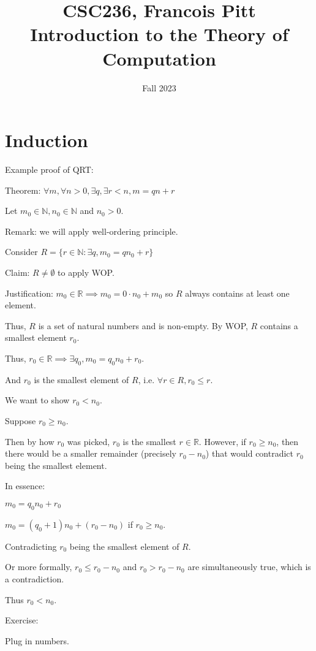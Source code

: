 \documentclass{article}
\title{CSC236, Francois Pitt \\ Introduction to the Theory of Computation}
\author{}
\date{Fall 2023}
\newcommand{\N}{\mathbb{N}}
\newcommand{\R}{\mathbb{R}}
\begin{document}
    
\maketitle

\tableofcontents

\pagebreak

\section{Induction}

Example proof of QRT:

Theorem: $\forall m, \forall n > 0, \exists q, \exists r < n, m = qn + r $

Let $m_0 \in \N, n_0 \in \N$ and $n_0 > 0$.

Remark: we will apply well-ordering principle. 

Consider $R=\{r \in \N : \exists q, m_0 = qn_0 + r\}$

Claim: $R \neq \emptyset$ to apply WOP\@.

Justification: $m_0 \in \R \implies m_0 = 0\cdot n_0 + m_0$ so $R$ always contains at least one element.

Thus, $R$ is a set of natural numbers and is non-empty. By WOP, $R$ contains a smallest element $r_0$.

Thus, $r_0 \in \R \implies \exists q_0, m_0 = q_0n_0 + r_0$.

And $r_0$ is the smallest element of $R$, i.e. $\forall r \in R, r_0 \leq r$.

We want to show $r_0 < n_0$.

Suppose $r_0 \geq n_0$.

Then by how $r_0$ was picked, $r_0$ is the smallest $r \in \R$. However, if $r_0 \geq n_0$, then there would be a smaller remainder (precisely $r_0 - n_0$) that would contradict $r_0$ being the smallest element.

In essence:

$m_0 = q_0 n_0 + r_0$

$m_0 = (q_0 + 1)n_0 + (r_0-n_0)$ if $r_0 \geq n_0$.

Contradicting $r_0$ being the smallest element of $R$.

Or more formally, $r_0 \leq r_0 - n_0$ and $r_0 > r_0 - n_0$ are simultaneously true, which is a contradiction.

Thus $r_0 < n_0$.

Exercise:

Plug in numbers.
\end{document}
